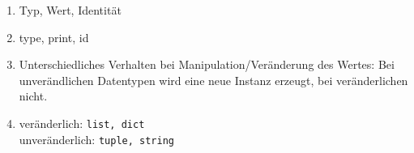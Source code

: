 \begin{enumerate}
	\item Typ, Wert, Identität
	\item type, print, id
	\item Unterschiedliches Verhalten bei Manipulation/Veränderung des Wertes: Bei unverändlichen Datentypen wird eine neue Instanz erzeugt, bei veränderlichen nicht.
	\item veränderlich: \texttt{list,~dict}\\ unveränderlich: \texttt{tuple,~string}
\end{enumerate}